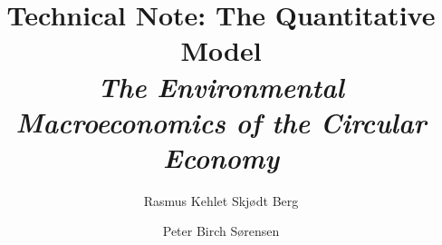 \documentclass[a4paper]{article}
\begin{document}

\title{Technical Note: The Quantitative Model \\
\emph{The Environmental Macroeconomics of the Circular Economy}}

\author{Rasmus Kehlet Skjødt Berg
\and
Peter Birch Sørensen
}
\maketitle








\appendix


\printbibliography
\end{document}
